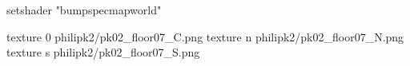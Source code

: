 setshader "bumpspecmapworld"

texture 0 philipk2/pk02_floor07_C.png
texture n philipk2/pk02_floor07_N.png
texture s philipk2/pk02_floor07_S.png

